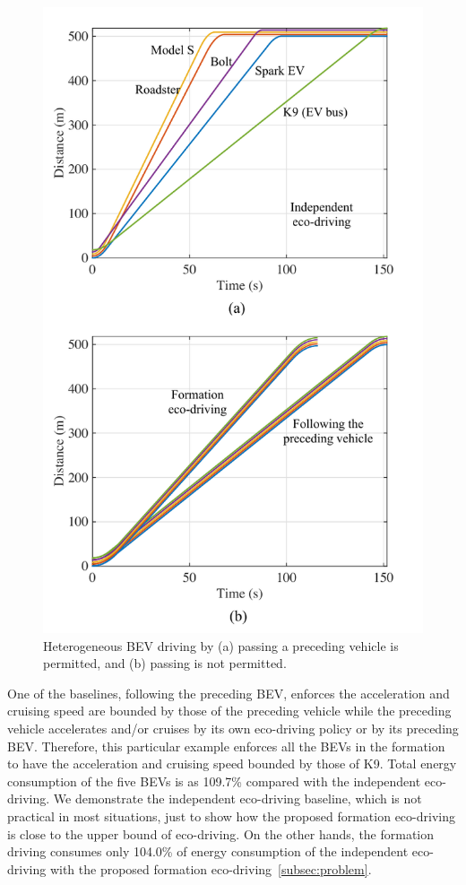 \documentclass{IEEEtran}
\begin{document}
\begin{figure}	%
\centering
\includegraphics[width=0.9\hsize]{Figures/Heterogeneous_driving.pdf}
\caption{Heterogeneous BEV driving by (a) passing a preceding vehicle is permitted, and (b) passing is not permitted.}
\label{fig:hetero_driving}
\end{figure} 


One of the baselines, following the preceding BEV, enforces the acceleration and cruising speed are bounded by those of the preceding vehicle while the preceding vehicle accelerates and/or cruises by its own eco-driving policy or by its preceding BEV. Therefore, this particular example enforces all the BEVs in the formation to have the acceleration and cruising speed bounded by those of K9. Total energy consumption of the five BEVs is as 109.7\% compared with the independent eco-driving. We demonstrate the independent eco-driving baseline, which is not practical in most situations, just to show how the proposed formation eco-driving is close to the upper bound of eco-driving.
On the other hands, the formation driving consumes only 104.0\% of energy consumption of the independent eco-driving with the proposed formation eco-driving~\ref{subsec:problem}.
\end{document}
